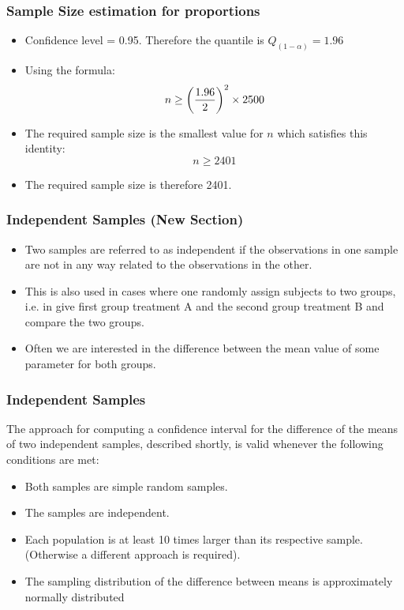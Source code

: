 \begin{frame}
\frametitle{Sample Size estimation for proportions}

\begin{itemize}
\item Confidence level = 0.95. Therefore the quantile is $Q_{(1-\alpha)} = 1.96$
\item Using the formula: \[ n \geq \left({1.96 \over 2 }\right)^2 \times 2500  \]
\item The required sample size is the smallest value for $n$ which satisfies this identity: \[ n \geq 2401  \]
\item The required sample size is therefore 2401.
\end{itemize}
\end{frame}


\begin{frame}
\frametitle{Independent Samples (New Section)}
\begin{itemize}
\item Two samples are referred to as independent if the observations in one sample are not in any way related to the observations in the other. \item This is also used in cases where one randomly assign subjects to two groups, i.e. in give first group treatment A and the second group treatment B and compare the two groups.
\item Often we are interested in the difference between the mean value of some parameter for both groups.
\end{itemize}
\end{frame}

\begin{frame}
\frametitle{Independent Samples}

The approach for computing a confidence interval for the difference of the means of two independent samples,  described shortly, is valid whenever the following conditions are met:

\begin{itemize}
\item Both samples are simple random samples.
\item The samples are independent.
\item Each population is at least 10 times larger than its respective sample. (Otherwise a different approach is required).
\item The sampling distribution of the difference between means is approximately normally distributed
\end{itemize}

\end{frame}

